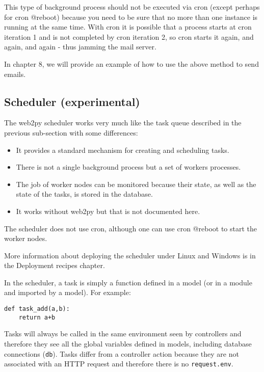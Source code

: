 \documentclass[justified,sixbynine,notoc]{tufte-book}
\def\ft{\small\tt}
\begin{document}
\begin{fullwidth}
This type of background process should not be executed via cron (except perhaps for cron @reboot) because you need to be sure that no more than one instance is running at the same time. With cron it is possible that a process starts at cron iteration 1 and is not completed by cron iteration 2, so cron starts it again, and again, and again - thus jamming the mail server.

In chapter 8, we will provide an example of how to use the above method to send emails.

\goodbreak\subsection{Scheduler (experimental)}

The web2py scheduler works very much like the task queue described in the previous sub-section with some differences:
\begin{itemize}
\item It provides a standard mechanism for creating and scheduling tasks.

\item There is not a single background process but a set of workers processes.

\item The job of worker nodes can be monitored because their state, as well as the state of the tasks, is stored in the database.

\item It works without web2py but that is not documented here.
\end{itemize}

The scheduler does not use cron, although one can use cron @reboot to start the worker nodes.

More information about deploying the scheduler under Linux and Windows is in the Deployment recipes chapter.

In the scheduler, a task is simply a function defined in a model (or in a module and imported by a model). For example:

\begin{lstlisting}
def task_add(a,b):
    return a+b
\end{lstlisting}

Tasks will always be called in the same environment seen by controllers and therefore they see all the global variables defined in models, including database connections ({\ft db}). Tasks differ from a controller action because they are not associated with an HTTP request and therefore there is no {\ft request.env}.


\end{fullwidth}
\end{document}
